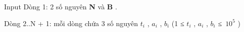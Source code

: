 Input  
Dòng 1: 2 số nguyên   \textbf{    N   }   và   \textbf{    B   }   .  

   Dòng 2..N + 1: mỗi dòng chứa 3 số nguyên   \textbf{    $t_{i}$}   ,   \textbf{    $a_{i}$}   ,   \textbf{    $b_{i}$}   (1 ≤   \textbf{    $t_{i}$}   ,   \textbf{    $a_{i}$}   ,   \textbf{    $b_{i}$}   ≤ $10^{5}$   )